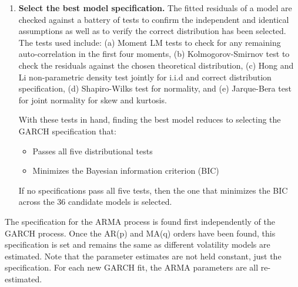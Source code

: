\documentclass[12pt]{article}
\begin{document}
\begin{enumerate}
    \item \textbf{Select the best model specification.} The fitted residuals of a model are checked against a battery of tests to confirm the independent and identical assumptions as well as to verify the correct distribution has been selected. The tests used include: (a) Moment LM tests to check for any remaining auto-correlation in the first four moments, (b) Kolmogorov-Smirnov test to check the residuals against the chosen theoretical distribution, (c) Hong and Li \cite{HongLi2005} non-parametric density test jointly for i.i.d and correct distribution specification, (d) Shapiro-Wilks \cite{ShapiroWilks1965} test for normality, and (e) Jarque-Bera \cite{JarqueBera1980} test for joint normality for skew and kurtosis.
    
    With these tests in hand, finding the best model reduces to selecting the GARCH specification that:
    
    \begin{itemize}
        \item Passes all five distributional tests
        \item Minimizes the Bayesian information criterion (BIC)
    \end{itemize}

    If no specifications pass all five tests, then the one that minimizes the BIC across the 36 candidate models is selected.

\end{enumerate}

The specification for the ARMA process is found first independently of the GARCH process. Once the AR(p) and MA(q) orders have been found, this specification is set and remains the same as different volatility models are estimated. Note that the parameter estimates are not held constant, just the specification. For each new GARCH fit, the ARMA parameters are all re-estimated.

\printbibliography
\end{document}
